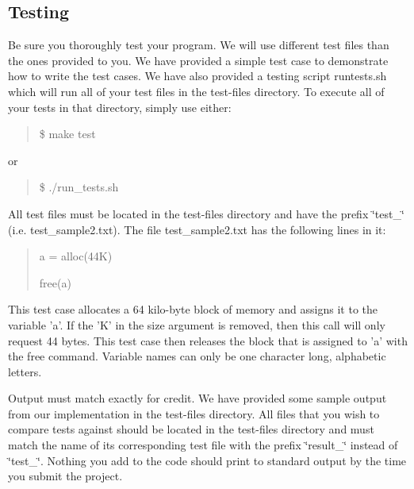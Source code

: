 \subsection*{Testing}

Be sure you thoroughly test your program. We will use different test files than the ones provided to you. We have provided a simple test case to demonstrate how to write the test cases. We have also provided a testing script {\ttfamily runtests.\-sh} which will run all of your test files in the test-\/files directory. To execute all of your tests in that directory, simply use either\-:

\begin{quotation}
{\ttfamily \$ make test}

\end{quotation}
or \begin{quotation}
{\ttfamily \$ ./run\-\_\-tests.sh}

\end{quotation}


All test files must be located in the test-\/files directory and have the prefix \char`\"{}test\-\_\-\char`\"{} (i.\-e. test\-\_\-sample2.\-txt). The file test\-\_\-sample2.\-txt has the following lines in it\-:

\begin{quotation}
{\ttfamily a = alloc(44\-K)} \par
 {\ttfamily free(a)}

\end{quotation}


This test case allocates a 64 kilo-\/byte block of memory and assigns it to the variable 'a'. If the 'K' in the size argument is removed, then this call will only request 44 bytes. This test case then releases the block that is assigned to 'a' with the free command. Variable names can only be one character long, alphabetic letters.

Output must match exactly for credit. We have provided some sample output from our implementation in the test-\/files directory. All files that you wish to compare tests against should be located in the test-\/files directory and must match the name of its corresponding test file with the prefix \char`\"{}result\-\_\-\char`\"{} instead of \char`\"{}test\-\_\-\char`\"{}. Nothing you add to the code should print to standard output by the time you submit the project. 